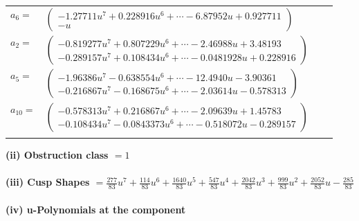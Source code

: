 \documentclass[1p]{elsarticle_modified}
\theoremstyle{definition}
\begin{document}
\begin{tabular}{m{7pt} m{180pt} m{7pt} m{180pt} }
\flushright $a_{6}=$&$\begin{pmatrix}-1.27711 u^{7}+0.228916 u^{6}+\cdots-6.87952 u+0.927711\\- u\end{pmatrix}$ \\
\flushright $a_{2}=$&$\begin{pmatrix}-0.819277 u^{7}+0.807229 u^{6}+\cdots-2.46988 u+3.48193\\-0.289157 u^{7}+0.108434 u^{6}+\cdots-0.0481928 u+0.228916\end{pmatrix}$ \\
\flushright $a_{5}=$&$\begin{pmatrix}-1.96386 u^{7}-0.638554 u^{6}+\cdots-12.4940 u-3.90361\\-0.216867 u^{7}-0.168675 u^{6}+\cdots-2.03614 u-0.578313\end{pmatrix}$ \\
\flushright $a_{10}=$&$\begin{pmatrix}-0.578313 u^{7}+0.216867 u^{6}+\cdots-2.09639 u+1.45783\\-0.108434 u^{7}-0.0843373 u^{6}+\cdots-0.518072 u-0.289157\end{pmatrix}$\\&\end{tabular}
\flushleft \textbf{(ii) Obstruction class $= 1$}\\~\\
\flushleft \textbf{(iii) Cusp Shapes $= \frac{277}{83} u^7+\frac{114}{83} u^6+\frac{1640}{83} u^5+\frac{547}{83} u^4+\frac{2042}{83} u^3+\frac{999}{83} u^2+\frac{2052}{83} u-\frac{285}{83}$}\\~\\
\newpage\renewcommand{\arraystretch}{1}
\flushleft \textbf{(iv) u-Polynomials at the component}\newline \\
\end{document}
